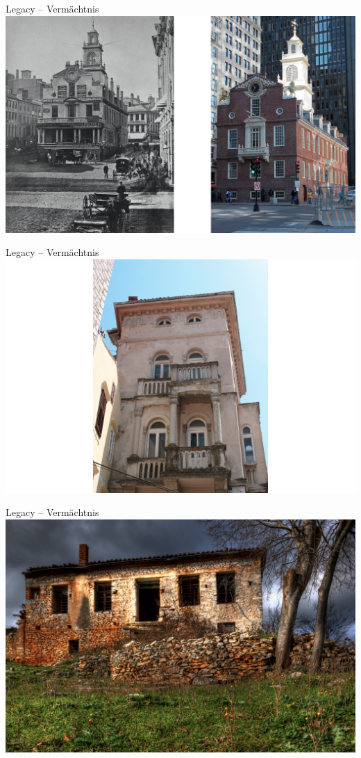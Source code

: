 \begin{frame}[fragile]{Legacy -- Vermächtnis}
\includegraphics[width=.8 \paperwidth]{OldStateHouse.png}
\end{frame}

\begin{frame}[fragile]{Legacy -- Vermächtnis}
\includegraphics[width=.8 \paperwidth]{AlteVilla.png}
\end{frame}

\begin{frame}[fragile]{Legacy -- Vermächtnis}
\includegraphics[width=.8 \paperwidth]{VerfallenesHaus.png}
\end{frame}

